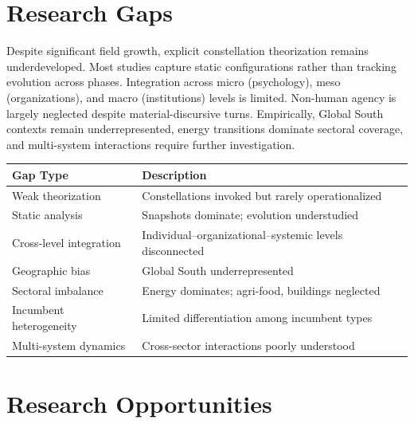 \documentclass[../main.tex]{subfiles}
\begin{document}
\section{Research Gaps}

Despite significant field growth, explicit constellation theorization remains underdeveloped. Most studies capture static configurations rather than tracking evolution across phases. Integration across micro (psychology), meso (organizations), and macro (institutions) levels is limited. Non-human agency is largely neglected despite material-discursive turns. Empirically, Global South contexts remain underrepresented, energy transitions dominate sectoral coverage, and multi-system interactions require further investigation.

\tablestriped
\small
\begin{center}
\begin{tabular}{@{}p{2.8cm}p{7cm}@{}}
\toprule
\textbf{Gap Type} & \textbf{Description} \\
\midrule
Weak theorization & Constellations invoked but rarely operationalized \\
Static analysis & Snapshots dominate; evolution understudied \\
Cross-level integration & Individual--organizational--systemic levels disconnected \\
Geographic bias & Global South underrepresented \\
Sectoral imbalance & Energy dominates; agri-food, buildings neglected \\
Incumbent heterogeneity & Limited differentiation among incumbent types \\
Multi-system dynamics & Cross-sector interactions poorly understood \\
\bottomrule
\end{tabular}
\label{tab:gaps}
\end{center}
\normalsize

\section{Research Opportunities}
\end{document}
